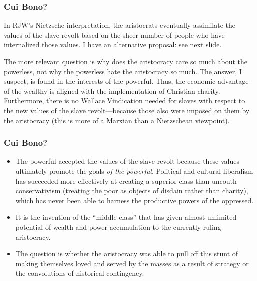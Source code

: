 \documentclass[xcolor=dvipsnames]{beamer}
\begin{document}
\begin{frame}
  \frametitle{Cui Bono?}
  In RJW's Nietzsche interpretation, the aristocrats eventually
  assimilate the values of the slave revolt based on the sheer number
  of people who have internalized those values. I have an alternative
  proposal: see next slide.

  \bigskip

  The more relevant question is why does the aristocracy care so much
  about the powerless, not why the powerless hate the aristocracy so
  much. The answer, I suspect, is found in the interests of the
  powerful. Thus, the economic advantage of the wealthy is aligned
  with the implementation of Christian charity. Furthermore, there is
  no Wallace Vindication needed for slaves with respect to the new
  values of the slave revolt---because those also were imposed on them
  by the aristocracy (this is more of a Marxian than a Nietzschean
  viewpoint). 
\end{frame}

\begin{frame}
  \frametitle{Cui Bono?}
  \begin{itemize}
  \item The powerful accepted the values of the slave revolt because
    these values ultimately promote the goals \emph{of the powerful}.
    Political and cultural liberalism has succeeded more effectively
    at creating a superior class than uncouth conservativism (treating
    the poor as objects of disdain rather than charity), which has
    never been able to harness the productive powers of the oppressed.
\item It is the invention of the ``middle class'' that has given
  almost unlimited potential of wealth and power accumulation to the
  currently ruling aristocracy.
\item The question is whether the aristocracy was able to pull off
  this stunt of making themselves loved and served by the masses as a
  result of strategy or the convolutions of historical contingency.
\end{itemize}
\end{frame}
\end{document}
